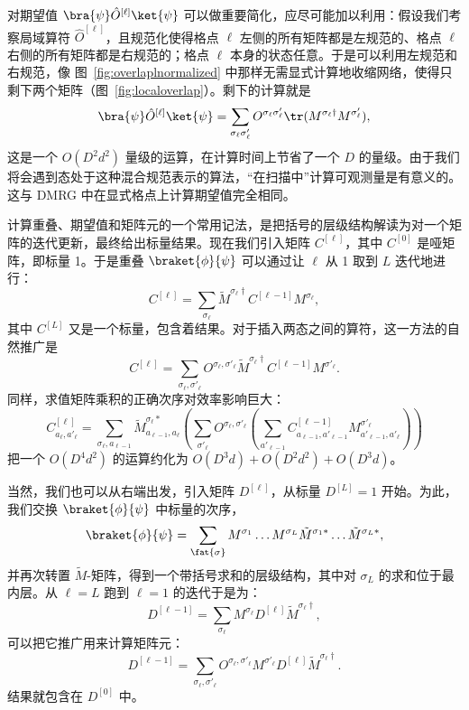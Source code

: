 对期望值 $\bra{\psi} \hat{O}^{[\ell]} \ket{\psi}$ 可以做重要简化，应尽可能加以利用：假设我们考察局域算符 $\hat{O}^{[\ell]}$，且规范化使得格点 $\ell$ 左侧的所有矩阵都是左规范的、格点 $\ell$ 右侧的所有矩阵都是右规范的；格点 $\ell$ 本身的状态任意。于是可以利用左规范和右规范，像 图~\ref{fig:overlaplnormalized} 中那样无需显式计算地收缩网络，使得只剩下两个矩阵（图~\ref{fig:localoverlap}）。剩下的计算就是
\begin{equation}
\bra{\psi} \hat{O}^{[\ell]} \ket{\psi} = \sum_{\sigma_\ell \sigma'_\ell} O^{\sigma_\ell \sigma'_\ell} \tr
(M^{\sigma_\ell \dagger} M^{\sigma'_\ell}),
\end{equation} 
这是一个 $O(D^2 d^2)$ 量级的运算，在计算时间上节省了一个 $D$ 的量级。由于我们将会遇到态处于这种混合规范表示的算法，“在扫描中”计算可观测量是有意义的。这与 DMRG 中在显式格点上计算期望值完全相同。
    
计算重叠、期望值和矩阵元的一个常用记法，是把括号的层级结构解读为对一个矩阵的迭代更新，最终给出标量结果。现在我们引入矩阵 $C^{[\ell]}$，其中 $C^{[0]}$ 是哑矩阵，即标量 1。于是重叠 $\braket{\phi}{\psi}$ 可以通过让 $\ell$ 从 1 取到 $L$ 迭代地进行：
\begin{equation}
C^{[\ell]} = \sum_{\sigma_\ell} \tilde{M}^{\sigma_{\ell}\dagger} C^{[\ell-1]} M^{\sigma_{\ell}} ,
\end{equation}
其中 $C^{[L]}$ 又是一个标量，包含着结果。对于插入两态之间的算符，这一方法的自然推广是
\begin{equation}
C^{[\ell]} = \sum_{\sigma_\ell,\sigma'_\ell} O^{\sigma_\ell,\sigma'_\ell} \tilde{M}^{\sigma_{\ell}\dagger} C^{[\ell-1]} M^{\sigma'_{\ell}} .
\end{equation}
同样，求值矩阵乘积的正确次序对效率影响巨大：
\begin{equation}
C^{[\ell]}_{a_\ell,a'_\ell} = \sum_{\sigma_\ell,a_{\ell-1}}  \tilde{M}^{\sigma_{\ell}*}_{a_{\ell-1},a_\ell} \left( \sum_{\sigma'_\ell} O^{\sigma_\ell,\sigma'_\ell} 
\left( \sum_{a'_{\ell-1}} C^{[\ell-1]}_{a_{\ell-1},a'_{\ell-1}} 
M^{\sigma'_{\ell}}_{a'_{\ell-1},a'_\ell} \right) \right) 
\end{equation}
把一个 $O(D^4 d^2)$ 的运算约化为 $O(D^3 d) + O(D^2d^2) + O(D^3 d)$。

当然，我们也可以从右端出发，引入矩阵 $D^{[\ell]}$，从标量
$D^{[L]}=1$ 开始。为此，我们交换 $\braket{\phi}{\psi}$ 中标量的次序，
\begin{equation}
\braket{\phi}{\psi} = \sum_{\fat{\sigma}}M^{\sigma_1} \ldots M^{\sigma_L}  \tilde{M}^{\sigma_1*} \ldots \tilde{M}^{\sigma_L*}  ,
\end{equation}
并再次转置 $\tilde{M}$-矩阵，得到一个带括号求和的层级结构，其中对 $\sigma_L$ 的求和位于最内层。从 $\ell=L$ 跑到 $\ell=1$ 的迭代于是为：
\begin{equation}
D^{[\ell-1]} = \sum_{\sigma_\ell}  M^{\sigma_{\ell}} D^{[\ell]} \tilde{M}^{\sigma_{\ell}\dagger} ,
\end{equation}
可以把它推广用来计算矩阵元：
\begin{equation}
D^{[\ell-1]} = \sum_{\sigma_\ell,\sigma'_\ell}  O^{\sigma_\ell,\sigma'_\ell} M^{\sigma'_{\ell}} D^{[\ell]} \tilde{M}^{\sigma_{\ell}\dagger} .
\end{equation}
结果就包含在 $D^{[0]}$ 中。

